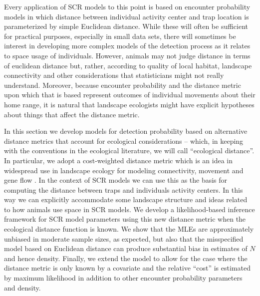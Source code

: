 Every application of SCR models to this point is based on encounter 
probability models in which distance between individual activity center 
and trap location is parameterized by simple Euclidean distance.
While these will often be sufficient for practical purposes,
especially in small data sets, there will sometimes be interest in
developing more complex models of the detection process as it relates
to space usage of individuals.
However, animals may not judge distance in terms of euclidean distance
but, rather, according to quality of local habitat, landscape
connectivity and other considerations that statisticians might not
really understand. Moreover, because encounter probability and the
distance metric upon which that is based represent outcomes of
individual movements about their home range, it is natural that
landscape ecologists might have explicit hypotheses about things that
affect the distance metric.

In this section we develop models for detection probability based on
alternative distance metrics that account for ecological
considerations -- which, in keeping with the conventions in the
ecological literature, we will call ``ecological distance''. In
particular, we adopt a cost-weighted distance metric which is an idea
in widespread use in landscape ecology for modeling connectivity,
movement and gene flow
\citep{adriaensen_etal:2003,manel_etal:2003,mcrae_etal:2008}. In the
context of SCR models we can use this as the basis for computing the
distance between traps and individuals activity centers. In this way
we can explicitly accommodate some landscape structure and ideas
related to how animals use space in SCR models. We develop a
likelihood-based inference framework for SCR model parameters using
this new distance metric when the ecological distance function is
known.  We show that the MLEs are approximately unbiased in moderate
sample sizes, as expected, but also that the misspecified model based
on Euclidean distance can produce substantial bias in estimates of $N$
and hence density.  Finally, we extend the model to allow for the case
where the distance metric is only known by a covariate and the
relative ``cost'' is estimated by maximum likelihood in addition to
other encounter probability parameters and density.


